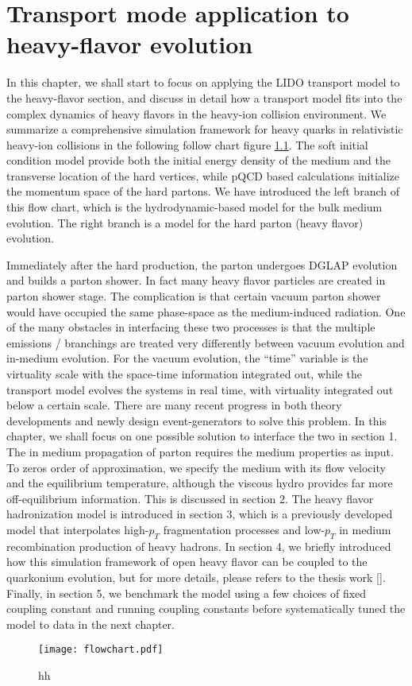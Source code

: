 \chapter{Transport mode application to heavy-flavor evolution}
In this chapter, we shall start to focus on applying the LIDO transport model to the heavy-flavor section, and discuss in detail how a transport model fits into the complex dynamics of heavy flavors in the heavy-ion collision environment.
We summarize a comprehensive simulation framework for heavy quarks in relativistic heavy-ion collisions in the following follow chart figure \ref{fig:flowchart}.
The soft initial condition model provide both the initial energy density of the medium and the transverse location of the hard vertices, while pQCD based calculations initialize the momentum space of the hard partons.
We have introduced the left branch of this flow chart, which is the hydrodynamic-based model for the bulk medium evolution.
The right branch is a model for the hard parton (heavy flavor) evolution.

Immediately after the hard production, the parton undergoes DGLAP evolution and builds a parton shower.
In fact many heavy flavor particles are created in parton shower stage.
The complication is that certain vacuum parton shower would have occupied the same phase-space as the medium-induced radiation.
One of the many obstacles in interfacing these two processes is that the multiple emissions / branchings are treated very differently between vacuum evolution and in-medium evolution.
For the vacuum evolution, the ``time'' variable is the virtuality scale with the space-time information integrated out, while the transport model evolves the systems in real time, with virtuality integrated out below a certain scale.
There are many recent progress in both theory developments and newly design event-generators to solve this problem.
In this chapter, we shall focus on one possible solution to interface the two in section 1.
The in medium propagation of parton requires the medium properties as input. 
To zeros order of approximation, we specify the medium with its flow velocity and the equilibrium temperature, although the viscous hydro provides far more off-equilibrium information. 
This is discussed in section 2.
The heavy flavor hadronization model is introduced in section 3, which is a previously developed model that interpolates high-$p_T$ fragmentation processes and low-$p_T$ in medium recombination production of heavy hadrons.
In section 4, we briefly introduced how this simulation framework of open heavy flavor can be coupled to the quarkonium evolution, but for more details, please refers to the thesis work [].
Finally, in section 5, we benchmark the model using a few choices of fixed coupling constant and running coupling constants before systematically tuned the model to data in the next chapter.
\begin{figure}
\centering
\texttt{[image: flowchart.pdf]}
\caption{hh}
\label{fig:flowchart}
\end{figure}

